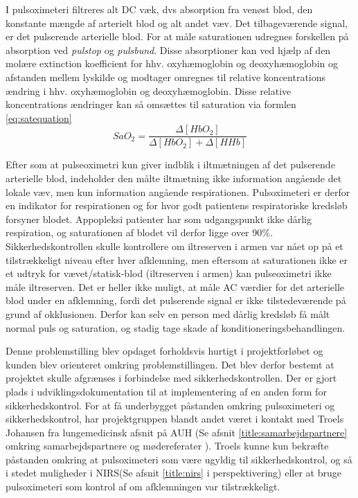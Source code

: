 I pulsoximeteri filtreres alt DC væk, dvs absorption fra venøst blod, den konstante mængde af arterielt blod og alt andet væv. Det tilbageværende signal, er det pulserende arterielle blod. For at måle saturationen udregnes forskellen på absorption ved \textit{pulstop} og \textit{pulsbund}. Disse absorptioner kan ved hjælp af den molære extinction koefficient for hhv. oxyhæmoglobin og deoxyhæmoglobin og afstanden mellem lyskilde og modtager omregnes til relative koncentrations ændring i hhv. oxyhæmoglobin og deoxyhæmoglobin. Disse relative koncentrations ændringer kan så omsættes til saturation via formlen \ref{eq:satequation}
\begin{equation}
	SaO_2 = \frac{\Delta[HbO_2]}{\Delta[HbO_2]+\Delta[HHb]}
	\label{eq:satequation}
\end{equation}

Efter som at pulseoximetri kun giver indblik i iltmætningen af det pulserende arterielle blod, indeholder den målte iltmætning ikke information angående det lokale væv, men kun information angående respirationen. Pulsoximeteri er derfor en indikator for respirationen og for hvor godt patientens respiratoriske kredsløb forsyner blodet. Appopleksi patienter har som udgangspunkt ikke dårlig respiration, og saturationen af blodet vil derfor ligge over 90\%. Sikkerhedskontrollen skulle kontrollere om iltreserven i armen var nået op på et tilstrækkeligt niveau efter hver afklemning, men eftersom at saturationen ikke er et udtryk for vævet/statisk-blod (iltreserven i armen) kan pulseoximetri ikke måle iltreserven.
Det er heller ikke muligt, at måle AC værdier for det arterielle blod under en afklemning, fordi det pulserende signal er ikke tilstedeværende på grund af okklusionen. Derfor kan selv en person med dårlig kredsløb få målt normal puls og saturation, og stadig tage skade af konditioneringsbehandlingen. 

Denne problemstilling blev opdaget forholdsvis hurtigt i projektforløbet og kunden blev orienteret omkring problemstillingen. Det blev derfor bestemt at projektet skulle afgrænses i forbindelse med sikkerhedskontrollen. Der er gjort plads i udviklingsdokumentation til at implementering af en anden form for sikkerhedskontrol. For at få underbygget påstanden omkring pulsoximeteri og sikkerhedskontrol, har projektgruppen blandt andet været i kontakt med Troels Johansen fra lungemedicinsk afsnit på AUH (Se afsnit \ref{title:samarbejdspartnere} omkring samarbejdspartnere og mødereferater ). Troels kunne kun bekræfte påstanden omkring at pulsoximeteri som være ugyldig til sikkerhedskontrol, og så i stedet muligheder i NIRS(Se afsnit \ref{title:nirs} i perspektivering) eller at bruge pulsoximeteri som kontrol af om afklemningen var tilstrækkeligt. 

